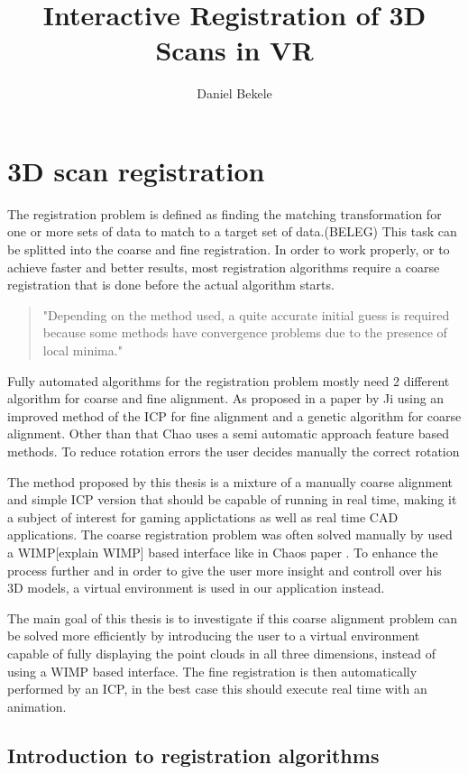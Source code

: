 \documentclass[hyperref,english,bachelorofscience,bibnum]{cgvpub}
\author{Daniel Bekele}
\title{Interactive Registration of 3D Scans in VR}
\begin{document}
\chapter{3D scan registration}
The registration problem is defined as finding the matching transformation for one or more sets of data to match to a target set of data.(BELEG)
This task can be splitted into the coarse and fine registration.
In order to work properly, or to achieve faster and better results, most registration algorithms require a coarse registration that is done before the actual algorithm starts. 
\begin{quote}
"Depending on the method used, a quite accurate initial
guess is required because some methods have convergence
problems due to the presence of local minima."\cite{salvi2007}
\end{quote}
Fully automated algorithms for the registration problem mostly need 2 different algorithm for coarse and fine alignment. As proposed in a paper by Ji \cite{Ji2017} using an improved method of the ICP for fine alignment and a genetic algorithm for coarse alignment. Other than that Chao uses a semi automatic approach feature based methods. To reduce rotation errors the user decides manually the correct rotation \cite{Chao}

The method proposed by this thesis is a mixture of a manually coarse alignment and simple ICP version that should be capable of running in real time, making it a subject of interest for gaming applictations as well as real time CAD applications.
The coarse registration problem was often solved manually by used a WIMP[explain WIMP] based interface like in Chaos paper \cite{Chao}. To enhance the process further and in order to give the user more insight and controll over his 3D models, a virtual environment is used in our application instead.

The main goal of this thesis is to investigate if this coarse alignment problem can be solved more efficiently by introducing the user to a virtual environment capable of fully displaying the point clouds in all three dimensions, instead of using a WIMP based interface.
The fine registration is then automatically performed by an ICP, in the best case this should execute real time with an animation.

\section{Introduction to registration algorithms}
\end{document}
